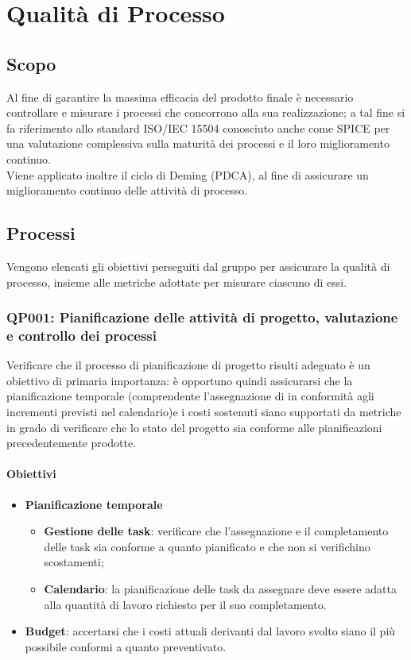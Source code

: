 \chapter{Qualità di Processo}
\label{processo} 
\section{Scopo}
Al fine di garantire la massima efficacia del prodotto finale è necessario controllare e misurare i processi che concorrono alla sua realizzazione; a tal fine si fa riferimento allo standard ISO/IEC 15504 conosciuto anche come SPICE per una valutazione complessiva sulla maturità dei processi e il loro miglioramento continuo.\\
Viene applicato inoltre il ciclo di Deming (PDCA), al fine di assicurare un miglioramento continuo delle attività di processo. 

\section{Processi}
Vengono elencati gli obiettivi perseguiti dal gruppo per assicurare la qualità di processo, insieme alle metriche adottate per misurare ciascuno di essi.
\subsection{QP001: Pianificazione delle attività di progetto, valutazione e controllo dei processi}
Verificare che il processo di pianificazione di progetto risulti adeguato è un obiettivo di primaria importanza: è opportuno quindi assicurarsi che la pianificazione temporale (comprendente l'assegnazione di  in conformità agli incrementi previsti nel calendario)e i costi sostenuti siano supportati da metriche in grado di verificare che lo stato del progetto sia conforme alle pianificazioni precedentemente prodotte.


\subsubsection{Obiettivi}
\begin{itemize}
	\item \textbf{Pianificazione temporale}
		\begin{itemize}
			\item \textbf{Gestione delle task}: verificare che l'assegnazione e il completamento delle task sia conforme a quanto pianificato e che non si verifichino scostamenti;
			\item \textbf{Calendario}: la pianificazione delle task da assegnare deve essere adatta alla quantità di lavoro richiesto per il suo completamento.
		\end{itemize}
	\item \textbf{Budget}: accertarsi che i costi attuali derivanti dal lavoro svolto siano il più possibile conformi a quanto preventivato.
\end{itemize}
